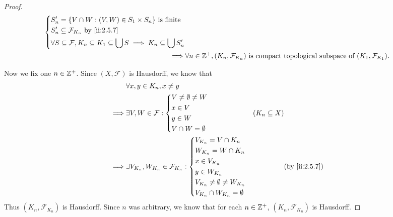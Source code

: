 \begin{proof}
\begin{align*}
\begin{dcases}
                                                                               S_n' = \set{V \cap W : (V, W) \in S_1 \times S_n} \text{ is finite} \\
                                                                               S_n' \subseteq \mathcal{F}_{K_n} \text{ by \cref{ii:2.5.7}}         \\
                                                                               \forall S \subseteq \mathcal{F}, K_n \subseteq K_1 \subseteq \bigcup S \implies K_n \subseteq \bigcup S_n'
                                                                             \end{dcases} \\
    \implies & \forall n \in \Z^+, (K_n, \mathcal{F}_{K_n}) \text{ is compact topological subspace of } (K_1, \mathcal{F}_{K_1}).
  \end{align*}

  Now we fix one \(n \in \mathbb{Z}^+\).
  Since \((X, \mathcal{F})\) is Hausdorff, we know that
  \begin{align*}
             & \forall x, y \in K_n, x \neq y                                                                    \\
    \implies & \exists V, W \in \mathcal{F} : \begin{dcases}
                                                V \neq \emptyset \neq W \\
                                                x \in V                 \\
                                                y \in W                 \\
                                                V \cap W = \emptyset
                                              \end{dcases}                   & (K_n \subseteq X)                 \\
    \implies & \exists V_{K_n}, W_{K_n} \in \mathcal{F}_{K_n} : \begin{dcases}
                                                                  V_{K_n} = V \cap K_n                \\
                                                                  W_{K_n} = W \cap K_n                \\
                                                                  x \in V_{K_n}                       \\
                                                                  y \in W_{K_n}                       \\
                                                                  V_{K_n} \neq \emptyset \neq W_{K_n} \\
                                                                  V_{K_n} \cap W_{K_n} = \emptyset
                                                                \end{dcases} &                   & \by{ii:2.5.7}
  \end{align*}
  Thus \((K_n, \mathcal{F}_{K_n})\) is Hausdorff.
  Since \(n\) was arbitrary, we know that for each \(n \in \mathbb{Z}^+\), \((K_n, \mathcal{F}_{K_n})\) is Hausdorff.


\end{proof}
